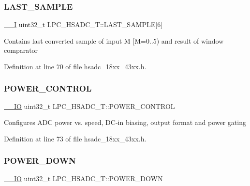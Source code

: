 \subsubsection{\texorpdfstring{L\+A\+S\+T\+\_\+\+S\+A\+M\+P\+LE}{LAST\_SAMPLE}}
{\footnotesize\ttfamily \hyperlink{core__sc300_8h_af63697ed9952cc71e1225efe205f6cd3}{\+\_\+\+\_\+I} uint32\+\_\+t L\+P\+C\+\_\+\+H\+S\+A\+D\+C\+\_\+\+T\+::\+L\+A\+S\+T\+\_\+\+S\+A\+M\+P\+LE\mbox{[}6\mbox{]}}

Contains last converted sample of input M \mbox{[}M=0..5) and result of window comparator 

Definition at line 70 of file hsadc\+\_\+18xx\+\_\+43xx.\+h.

\mbox{\label{struct_l_p_c___h_s_a_d_c___t_af3f9764120cd64fd2174abe3428452df}} 
\subsubsection{\texorpdfstring{P\+O\+W\+E\+R\+\_\+\+C\+O\+N\+T\+R\+OL}{POWER\_CONTROL}}
{\footnotesize\ttfamily \hyperlink{core__sc300_8h_aec43007d9998a0a0e01faede4133d6be}{\+\_\+\+\_\+\+IO} uint32\+\_\+t L\+P\+C\+\_\+\+H\+S\+A\+D\+C\+\_\+\+T\+::\+P\+O\+W\+E\+R\+\_\+\+C\+O\+N\+T\+R\+OL}

Configures A\+DC power vs. speed, D\+C-\/in biasing, output format and power gating 

Definition at line 73 of file hsadc\+\_\+18xx\+\_\+43xx.\+h.

\mbox{\label{struct_l_p_c___h_s_a_d_c___t_a79b141398f6d66e2299f1377c53748b2}} 
\subsubsection{\texorpdfstring{P\+O\+W\+E\+R\+\_\+\+D\+O\+WN}{POWER\_DOWN}}
{\footnotesize\ttfamily \hyperlink{core__sc300_8h_aec43007d9998a0a0e01faede4133d6be}{\+\_\+\+\_\+\+IO} uint32\+\_\+t L\+P\+C\+\_\+\+H\+S\+A\+D\+C\+\_\+\+T\+::\+P\+O\+W\+E\+R\+\_\+\+D\+O\+WN}


